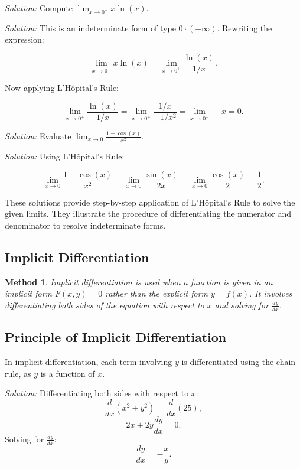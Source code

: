 \documentclass[a4paper,12pt]{book}
\newenvironment{solution}[1][]
{\par\noindent\textit{Solution:} \rmfamily}{\medskip}
\newcounter{example}
\newtheorem{method}{Method}
\begin{document}
\begin{solution}[to Problem 4]
Compute \( \lim_{x \to 0^+} x \ln(x) \).

\textit{Solution:}
This is an indeterminate form of type \( 0 \cdot (-\infty) \). Rewriting the expression:

\[
\lim_{x \to 0^+} x \ln(x) = \lim_{x \to 0^+} \frac{\ln(x)}{1/x}.
\]

Now applying L'Hôpital's Rule:

\[
\lim_{x \to 0^+} \frac{\ln(x)}{1/x} = \lim_{x \to 0^+} \frac{1/x}{-1/x^2} = \lim_{x \to 0^+} -x = 0.
\]
\end{solution}

\begin{solution}[to Problem 5]
Evaluate \( \lim_{x \to 0} \frac{1 - \cos(x)}{x^2} \).

\textit{Solution:}
Using L'Hôpital's Rule:

\[
\lim_{x \to 0} \frac{1 - \cos(x)}{x^2} = \lim_{x \to 0} \frac{\sin(x)}{2x} = \lim_{x \to 0} \frac{\cos(x)}{2} = \frac{1}{2}.
\]
\end{solution}

These solutions provide step-by-step application of L'Hôpital's Rule to solve the given limits. They illustrate the procedure of differentiating the numerator and denominator to resolve indeterminate forms.

\subsection{Implicit Differentiation}

\begin{method}
Implicit differentiation is used when a function is given in an implicit form \( F(x, y) = 0 \) rather than the explicit form \( y = f(x) \). It involves differentiating both sides of the equation with respect to \( x \) and solving for \( \frac{dy}{dx} \).
\end{method}

\subsection{Principle of Implicit Differentiation}
In implicit differentiation, each term involving \( y \) is differentiated using the chain rule, as \( y \) is a function of \( x \).


\begin{solution}
Differentiating both sides with respect to \( x \):
\[ \frac{d}{dx}(x^2 + y^2) = \frac{d}{dx}(25), \]
\[ 2x + 2y \frac{dy}{dx} = 0. \]
Solving for \( \frac{dy}{dx} \):
\[ \frac{dy}{dx} = -\frac{x}{y}. \]
\end{solution}
\end{document}

